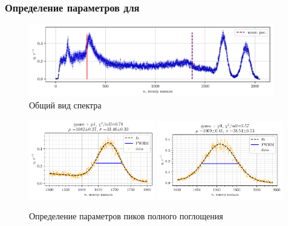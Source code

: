 





\newpage


\subsubsection*{Определение параметров для \co}


\begin{figure}[h!]
    \centering
    \includegraphics[width=0.95\textwidth]{figures/co_0.pdf}
    \caption{Общий вид спектра \co}
\end{figure}



\begin{figure}[h!]
    \centering
    \includegraphics[width=0.49\textwidth]{figures/co_p1.pdf}
    \includegraphics[width=0.49\textwidth]{figures/co_p2.pdf}
    \vspace{-2mm}
    \caption{Определение параметров пиков полного поглощения \co}
\end{figure}



